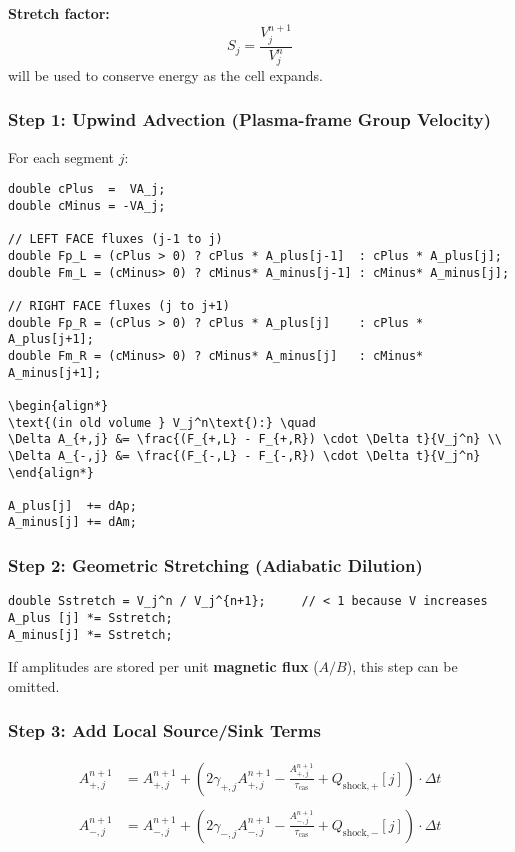 \textbf{Stretch factor:}
\[
S_j = \frac{V_j^{n+1}}{V_j^n}
\]
will be used to conserve energy as the cell expands.

\subsubsection*{Step 1: Upwind Advection (Plasma-frame Group Velocity)}

For each segment $j$:

\begin{verbatim}
double cPlus  =  VA_j;
double cMinus = -VA_j;

// LEFT FACE fluxes (j-1 to j)
double Fp_L = (cPlus > 0) ? cPlus * A_plus[j-1]  : cPlus * A_plus[j];
double Fm_L = (cMinus> 0) ? cMinus* A_minus[j-1] : cMinus* A_minus[j];

// RIGHT FACE fluxes (j to j+1)
double Fp_R = (cPlus > 0) ? cPlus * A_plus[j]    : cPlus * A_plus[j+1];
double Fm_R = (cMinus> 0) ? cMinus* A_minus[j]   : cMinus* A_minus[j+1];

\begin{align*}
\text{(in old volume } V_j^n\text{):} \quad
\Delta A_{+,j} &= \frac{(F_{+,L} - F_{+,R}) \cdot \Delta t}{V_j^n} \\
\Delta A_{-,j} &= \frac{(F_{-,L} - F_{-,R}) \cdot \Delta t}{V_j^n}
\end{align*}

A_plus[j]  += dAp;
A_minus[j] += dAm;
\end{verbatim}

\subsubsection*{Step 2: Geometric Stretching (Adiabatic Dilution)}

\begin{verbatim}
double Sstretch = V_j^n / V_j^{n+1};     // < 1 because V increases
A_plus [j] *= Sstretch;
A_minus[j] *= Sstretch;
\end{verbatim}

If amplitudes are stored per unit \textbf{magnetic flux} ($A/B$), this step can be omitted.

\subsubsection*{Step 3: Add Local Source/Sink Terms}

\begin{align*}
A_{+,j}^{n+1} &= A_{+,j}^{n+1} 
+ \left( 2 \gamma_{+,j} A_{+,j}^{n+1} 
       - \frac{A_{+,j}^{n+1}}{\tau_{\text{cas}}} 
       + Q_{\text{shock},+}[j] \right) \cdot \Delta t \\
\\
A_{-,j}^{n+1} &= A_{-,j}^{n+1} 
+ \left( 2 \gamma_{-,j} A_{-,j}^{n+1} 
       - \frac{A_{-,j}^{n+1}}{\tau_{\text{cas}}} 
       + Q_{\text{shock},-}[j] \right) \cdot \Delta t
\end{align*}

